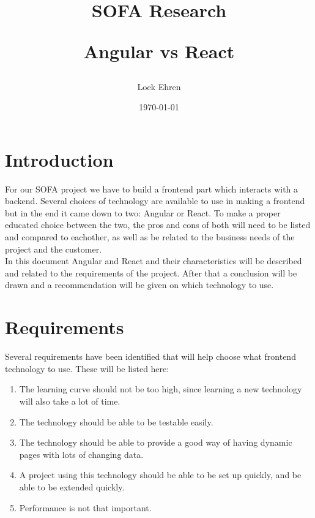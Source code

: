 \documentclass{report}
\begin{document}
	\author{Loek Ehren}
	\date{\today}
	\title{SOFA Research \\
		\begin{large} 
			Angular vs React
		\end{large} }
	
	\maketitle
	
	\newpage
	
	\tableofcontents
	
	\chapter{Introduction}
	
	For our SOFA project we have to build a frontend part which interacts with a backend. Several choices of technology are available to use in making a frontend but in the end it came down to two: Angular or React. To make a proper educated choice between the two, the pros and cons of both will need to be listed and compared to eachother, as well as be related to the business needs of the project and the customer. \\
	In this document Angular and React and their characteristics will be described and related to the requirements of the project. After that a conclusion will be drawn and a recommendation will be given on which technology to use.
	
	\chapter{Requirements}
	Several requirements have been identified that will help choose what frontend technology to use. These will be listed here:
	\begin{enumerate}
		\item The learning curve should not be too high, since learning a new technology will also take a lot of time.
		\item The technology should be able to be testable easily.
		\item The technology should be able to provide a good way of having dynamic pages with lots of changing data.
		\item A project using this technology should be able to be set up quickly, and be able to be extended quickly.
		\item Performance is not that important.
	\end{enumerate}
	
\end{document}
